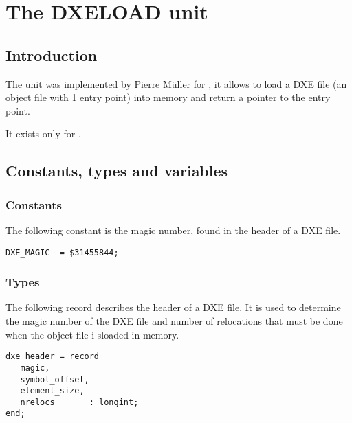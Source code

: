 %
%
%
%
%
\chapter{The DXELOAD unit}
\section{Introduction}
The  unit was implemented by Pierre M\"uller for \dos,
it allows to load a DXE file (an object file with 1 entry point)
into memory and return a pointer to the entry point.

It exists only for \dos.

\section{Constants, types and variables}
\subsection{Constants}
The following constant is the magic number, found in the header of a DXE
file.
\begin{verbatim}
DXE_MAGIC  = $31455844;
\end{verbatim}
\subsection{Types}
The following record describes the header of a DXE file. It is used to
determine the magic number of the DXE file and number of relocations that 
must be done when the object file i sloaded in memory.
\begin{verbatim}
dxe_header = record
   magic,
   symbol_offset,
   element_size,
   nrelocs       : longint;
end;
\end{verbatim}

